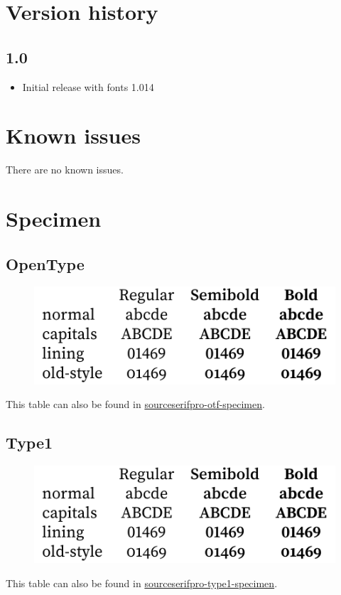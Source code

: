 \documentclass[11pt,a4paper,english]{article}
\newcommand*\file[1]{\href{run:#1.pdf}{#1}}
\begin{document}
\begin{multicols}{2}
\section{Version history}
\subsection*{1.0}
\begin{itemize}
	\item Initial release with fonts 1.014
\end{itemize}

\section{Known issues}
\begin{itemize*}
	\item There are no known issues.
\end{itemize*}

\newpage
\end{multicols}

\section{Specimen}
\label{sec:specimen}
\subsection{OpenType}
\begin{figure}[ht]
	\centering
	\includegraphics{sourceserifpro-otf-specimen}
\end{figure}
This table can also be found in \file{sourceserifpro-otf-specimen}.

\subsection{Type1}
\begin{figure}[ht]
	\centering
	\includegraphics{sourceserifpro-type1-specimen}
\end{figure}
This table can also be found in \file{sourceserifpro-type1-specimen}.
\end{document}
